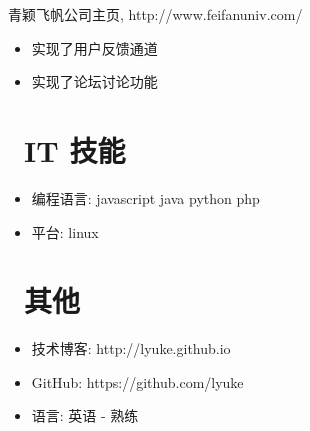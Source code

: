 \documentclass{resume}
\begin{document}
\begin{onehalfspacing}
青颖飞帆公司主页, http://www.feifanuniv.com/
\begin{itemize}
  \item 实现了用户反馈通道
  \item 实现了论坛讨论功能
\end{itemize}
\end{onehalfspacing}


\section{\faCogs\ IT 技能}
\begin{itemize}[parsep=0.5ex]
  \item 编程语言: javascript java python php
  \item 平台: linux
\end{itemize}


\section{\faInfo\ 其他}
\begin{itemize}[parsep=0.5ex]
  \item 技术博客: http://lyuke.github.io
  \item GitHub: https://github.com/lyuke
  \item 语言: 英语 - 熟练
\end{itemize}

%
%
\end{document}
